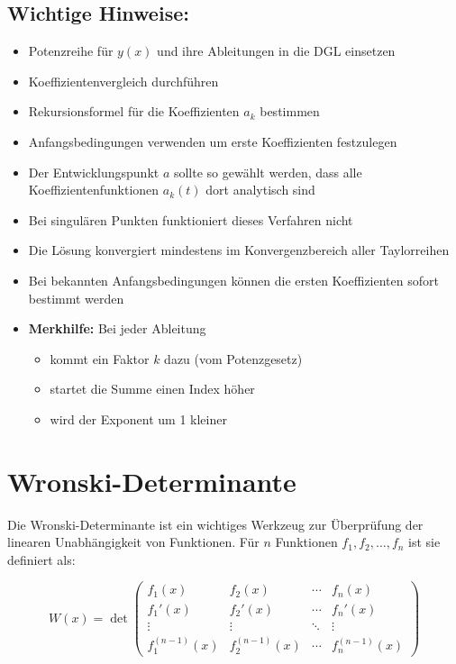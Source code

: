 \documentclass[a4paper,11pt,oneside,open=any,parskip=half, DIV=15]{scrreprt}
\begin{document}
   \subsection*{Wichtige Hinweise:}
      \begin{itemize}
         \item Potenzreihe für \(y(x)\) und ihre Ableitungen in die DGL einsetzen
         \item Koeffizientenvergleich durchführen
         \item Rekursionsformel für die Koeffizienten \(a_k\) bestimmen
         \item Anfangsbedingungen verwenden um erste Koeffizienten festzulegen
         \item Der Entwicklungspunkt \(a\) sollte so gewählt werden, dass alle Koeffizientenfunktionen \(a_k(t)\) dort analytisch sind
         \item Bei singulären Punkten funktioniert dieses Verfahren nicht
         \item Die Lösung konvergiert mindestens im Konvergenzbereich aller Taylorreihen
         \item Bei bekannten Anfangsbedingungen können die ersten Koeffizienten sofort bestimmt werden
         \item \textbf{Merkhilfe:} Bei jeder Ableitung 
         \begin{itemize}
            \item kommt ein Faktor \(k\) dazu (vom Potenzgesetz)
            \item startet die Summe einen Index höher
            \item wird der Exponent um 1 kleiner
         \end{itemize}
      \end{itemize}

\section{Wronski-Determinante}

   Die Wronski-Determinante ist ein wichtiges Werkzeug zur Überprüfung der linearen Unabhängigkeit von Funktionen. Für \(n\) Funktionen \(f_1, f_2, \ldots, f_n\) ist sie definiert als:
   \begin{importantbox}
      \[
         W(x) = \det 
         \begin{pmatrix}
            f_1(x) & f_2(x) & \cdots & f_n(x) \\
            f_1'(x) & f_2'(x) & \cdots & f_n'(x) \\
            \vdots & \vdots & \ddots & \vdots \\
            f_1^{(n-1)}(x) & f_2^{(n-1)}(x) & \cdots & f_n^{(n-1)}(x)
         \end{pmatrix}
      \]        
   \end{importantbox}
\end{document}
